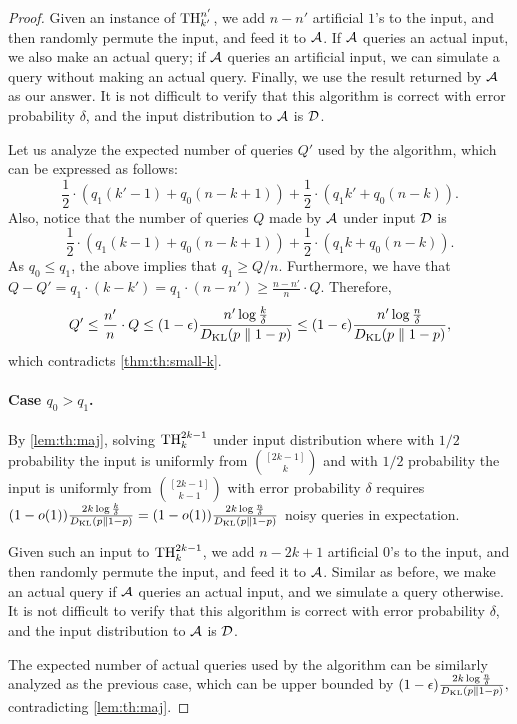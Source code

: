 \begin{proof}
  Given an instance of $\Threshold{n'}{k'}$, we add $n - n'$ artificial $1$'s to the input, and then randomly permute the input, and feed it to $\cA$. If $\cA$ queries an actual input, we also make an actual query; if $\cA$ queries an artificial input, we can simulate a query without making an actual query. Finally, we use the result returned by $\cA$ as our answer. It is not difficult to verify that this algorithm is correct with error probability $\delta$, and the input distribution to $\cA$ is $\cD$.

  Let us analyze the expected number of queries $Q'$ used by the algorithm, which can be expressed as follows:
  \[
  \frac{1}{2} \cdot \left(q_1 (k' - 1) + q_0 (n - k + 1) \right) + \frac{1}{2} \cdot \left(q_1 k' + q_0 (n - k) \right).
  \]
  Also, notice that the number of queries $Q$ made by $\cA$ under input $\cD$ is
  \[
  \frac{1}{2} \cdot \left(q_1 (k - 1) + q_0 (n - k + 1) \right) + \frac{1}{2} \cdot \left(q_1 k + q_0 (n - k) \right).
  \]
  As $q_0 \le q_1$, the above implies that $q_1 \ge Q / n$. Furthermore, we have that $Q - Q' = q_1 \cdot (k - k') = q_1 \cdot (n - n') \ge \frac{n - n'}{n} \cdot Q$. Therefore,
  \[
  Q' \le \frac{n'}{n} \cdot Q \le (1-\epsilon)\frac{n' \log \frac{k}{\delta}}{\DKL} \le  (1-\epsilon)\frac{n' \log \frac{n}{\delta}}{\DKL},
  \]
  which contradicts \cref{thm:th:small-k}.

  \paragraph{Case $q_0 > q_1$.}
  By \cref{lem:th:maj}, solving $\Threshold{2k-1}{k}$ under input distribution where with $1/2$ probability the input is uniformly from $\binom{[2k-1]}{k}$ and with $1/2$ probability the input is uniformly from $\binom{[2k-1]}{k - 1}$ with error probability $\delta$ requires $(1-o(1))\frac{2k \log \frac{k}{\delta}}{\DKL} = (1-o(1))\frac{2k \log \frac{n}{\delta}}{\DKL}$ noisy queries in expectation.

  Given such an input to $\Threshold{2k-1}{k}$, we add $n - 2k+1$ artificial $0$'s to the input, and then randomly permute the input, and feed it to $\cA$. Similar as before, we make an actual query if $\cA$ queries an actual input, and we simulate a query otherwise. It is not difficult to verify that this algorithm is correct with error probability $\delta$, and the input distribution to $\cA$ is $\cD$.

  The expected number of actual queries used by the algorithm can be similarly analyzed as the previous case, which can be upper bounded by
  $(1-\epsilon)\frac{2k \log \frac{n}{\delta}}{\DKL},
  $
  contradicting \cref{lem:th:maj}.
\end{proof}



